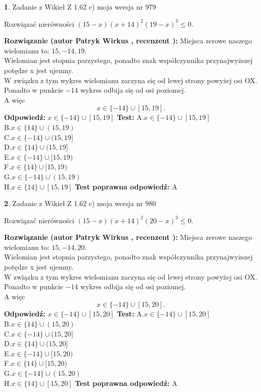 \documentclass[12pt, a4paper]{article}
\theoremstyle{definition} %
\newtheorem{zad}{}
\newcommand{\zadStart}[1]{\begin{zad}#1\newline}
\newcommand{\zadStop}{\end{zad}}
\newcommand{\rozwStart}[2]{\noindent \textbf{Rozwiązanie (autor #1 , recenzent #2): }\newline}
\newcommand{\rozwStop}{\newline}
\newcommand{\odpStart}{\noindent \textbf{Odpowiedź:}\newline}
\newcommand{\odpStop}{\newline}
\newcommand{\testStart}{\noindent \textbf{Test:}\newline}
\newcommand{\testStop}{\newline}
\newcommand{\kluczStart}{\noindent \textbf{Test poprawna odpowiedź:}\newline}
\newcommand{\kluczStop}{\newline}
\begin{document}
\zadStart{Zadanie z Wikieł Z 1.62 c) moja wersja nr 979}

Rozwiązać nierówności $(15-x)(x+14)^{2}(19-x)^{3}\le0$.
\zadStop
\rozwStart{Patryk Wirkus}{}
Miejsca zerowe naszego wielomianu to: $15, -14, 19$.\\
Wielomian jest stopnia parzystego, ponadto znak współczynnika przy\linebreak najwyższej potędze x jest ujemny.\\ W związku z tym wykres wielomianu zaczyna się od lewej strony powyżej osi OX.\\
Ponadto w punkcie $-14$ wykres odbija się od osi poziomej.\\
A więc $$x \in \{-14\} \cup [15,19].$$
\rozwStop
\odpStart
$x \in \{-14\} \cup [15,19]$
\odpStop
\testStart
A.$x \in \{-14\} \cup [15,19]$\\
B.$x \in \{14\} \cup (15,19)$\\
C.$x \in \{-14\} \cup (15,19]$\\
D.$x \in \{14\} \cup (15,19]$\\
E.$x \in \{-14\} \cup [15,19)$\\
F.$x \in \{14\} \cup [15,19)$\\
G.$x \in \{-14\} \cup (15,19)$\\
H.$x \in \{14\} \cup [15,19]$
\testStop
\kluczStart
A
\kluczStop



\zadStart{Zadanie z Wikieł Z 1.62 c) moja wersja nr 980}

Rozwiązać nierówności $(15-x)(x+14)^{2}(20-x)^{3}\le0$.
\zadStop
\rozwStart{Patryk Wirkus}{}
Miejsca zerowe naszego wielomianu to: $15, -14, 20$.\\
Wielomian jest stopnia parzystego, ponadto znak współczynnika przy\linebreak najwyższej potędze x jest ujemny.\\ W związku z tym wykres wielomianu zaczyna się od lewej strony powyżej osi OX.\\
Ponadto w punkcie $-14$ wykres odbija się od osi poziomej.\\
A więc $$x \in \{-14\} \cup [15,20].$$
\rozwStop
\odpStart
$x \in \{-14\} \cup [15,20]$
\odpStop
\testStart
A.$x \in \{-14\} \cup [15,20]$\\
B.$x \in \{14\} \cup (15,20)$\\
C.$x \in \{-14\} \cup (15,20]$\\
D.$x \in \{14\} \cup (15,20]$\\
E.$x \in \{-14\} \cup [15,20)$\\
F.$x \in \{14\} \cup [15,20)$\\
G.$x \in \{-14\} \cup (15,20)$\\
H.$x \in \{14\} \cup [15,20]$
\testStop
\kluczStart
A
\kluczStop
\end{document}
